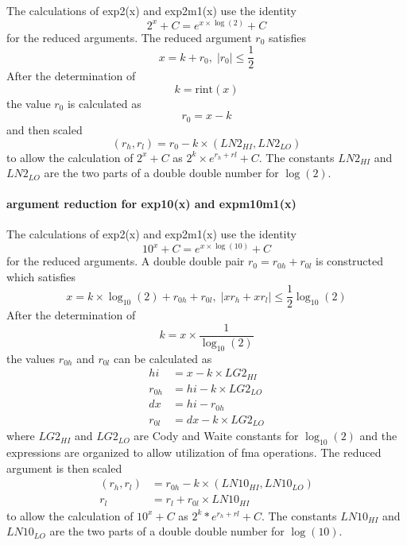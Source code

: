 \documentclass[10pt,a4paper,final,oneside]{article}
\numberwithin{equation}{subsection}
\begin{document}
    The calculations of exp2(x) and exp2m1(x) use the
    identity
    \begin{equation}
        2^x + C = e^{x \times \log{(2)}} + C
    \end{equation}
    for the reduced arguments.
    The reduced argument $ r_0 $ satisfies
    \begin{equation}
        x = k + r_0, \;
        |r_0| \le \frac{1}{2}
    \end{equation}
    After the determination of
    \[
        k = \text{rint}(x)
    \]
    the value $r_0$ is calculated as
    \[
       r_0 = x - k
    \]
    and then scaled
    \[
       (r_h, r_l) = r_0 - k \times (LN2_{HI}, LN2_{LO})
    \]
    to allow the calculation of $ 2^x + C $ as $ 2^k \times e^{r_h+ rl} + C$.
    The constants $LN2_{HI}$ and $LN2_{LO}$ are the two parts of a double double number for $\log{(2)}$.

\paragraph{argument reduction for exp10(x) and expm10m1(x)}

    The calculations of exp2(x) and exp2m1(x) use the
    identity
    \begin{equation}
        10^x + C = e^{x \times \log{(10)}} + C
    \end{equation}
    for the reduced arguments. A  double double pair $ r_0= r_{0h} + r_{0l} $ is constructed which satisfies
    \begin{equation}
        x = k \times \log_{10}{(2)} + r_{0h} + r_{0l}, \;
        |xr_h +xr_l| \le \frac{1}{2} \log_{10}{(2)}
    \end{equation}
    After the determination of
    \[
        k = x \times \frac{1}{\log_{10}{(2)}}
    \]
    the values $r_{0h}$ and $r_{0l}$ can be calculated as
    \[
       \begin{aligned}
       hi &= x - k \times LG2_{HI} \\
       r_{0h} &= hi - k \times LG2_{LO} \\
       dx & = hi - r_{0h} \\
       r_{0l} &= dx - k \times LG2_{LO}
       \end{aligned}
    \]
    where $LG2_{HI}$ and $LG2_{LO}$ are Cody and Waite constants for
    $\log_{10}{(2)}$
    and the expressions are organized to allow utilization of fma operations.
    The reduced argument is then scaled
    \[
        \begin{aligned}
        (r_h, r_l) &= r_{0h} - k \times (LN10_{HI}, LN10_{LO}) \\
        r_l &= r_l + r_{0l} \times LN10_{HI}
        \end{aligned}
    \]
    to allow the calculation of $ 10^x + C $ as $ 2^k * e^{r_h+ rl} + C$.
    The constants $LN10_{HI}$ and $LN10_{LO}$ are the two parts of a double double number for $\log(10)$.
\end{document}
